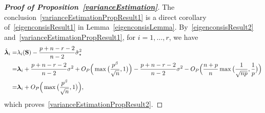 \documentclass[3p]{elsarticle}
\newcommand{\bfsym}[1]{\ensuremath{\boldsymbol{#1}}}
\def\blambda {\bfsym {\lambda}}        \def\bLambda {\bfsym {\Lambda}}
\theoremstyle{plain}
\theoremstyle{definition}
\theoremstyle{remark}
\begin{document}
\begin{appendices}
\begin{proof}[\textbf{Proof of Proposition~\ref{varianceEstimation}}]
    The conclusion~\eqref{varianceEstimationPropResult1} is a direct corollary of~\eqref{eigenconsisResult1} in Lemma~\ref{eigenconsisLemma}.
    By~\eqref{eigenconsisResult2} and~\eqref{varianceEstimationPropResult1}, for $i=1,\ldots, r$, we have 
    $$
    \begin{aligned}
        \hat{\blambda}_i=&
        \lambda_i(\BS)-\frac{p+n-r-2}{n-2}\hat{\sigma}_*^2\\
        =& \blambda_i +\frac{p+n-r-2}{n-2}\sigma^2+O_P\Big(\max\big(\frac{p^{\beta}}{\sqrt{n}},1\big)\Big)
        -\frac{p+n-r-2}{n-2}\sigma^2-O_P\Big( \frac{n+p}{n}\max\big(\frac{1}{\sqrt{np}},\frac{1}{p}\big)\Big)\\
        =& \blambda_i+O_P\Big(\max\big(\frac{p^{\beta}}{\sqrt{n}},1\big)\Big),
    \end{aligned}
    $$
    which proves~\eqref{varianceEstimationPropResult2}.
\end{proof}




\end{appendices}
\end{document}
